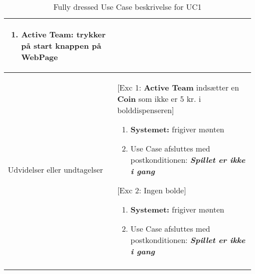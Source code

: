 \documentclass[Kravspecifikation/Kravspec_Main.tex]{subfiles}
\begin{document}
\begin{longtable}[]{@{}ll@{}}
\begin{minipage}[t]{0.47\columnwidth}
\begin{enumerate}
\item
  {\textbf{Active Team:} trykker på start knappen på WebPage}
\end{enumerate}\strut
\end{minipage}\tabularnewline
\toprule
\begin{minipage}[t]{0.47\columnwidth}\raggedright
{Udvidelser eller undtagelser}\strut
\end{minipage} & \begin{minipage}[t]{0.47\columnwidth}\raggedright
{[Exc 1: \textbf{Active Team} indsætter en \textbf{Coin} som ikke er 5 kr. i bolddispenseren]}
\begin{enumerate}
\tightlist
\item \textbf{Systemet:} frigiver mønten
\item Use Case afsluttes med postkonditionen:  \textbf{\textit{Spillet er ikke i gang}}
\end{enumerate}
{[Exc 2: Ingen bolde]}
\begin{enumerate}
\tightlist
\item \textbf{Systemet:} frigiver mønten
\item Use Case afsluttes med postkonditionen:  \textbf{\textit{Spillet er ikke i gang}}
\end{enumerate}
{}\strut
\end{minipage}\tabularnewline
\bottomrule
\bottomrule
\caption{Fully dressed Use Case beskrivelse for UC1}
\label{tab:UC1}
\end{longtable}
\end{document}
